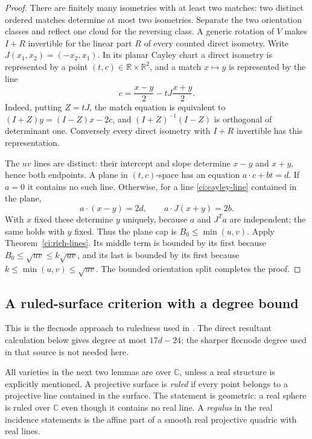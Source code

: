 \begin{proof}
There are finitely many isometries with at least two matches: two
distinct ordered matches determine at most two isometries.  Separate
the two orientation classes and reflect one cloud for the reversing
class.  A generic rotation of $V$ makes $I+R$ invertible for the
linear part $R$ of every counted direct isometry.  Write
$J(x_1,x_2)=(-x_2,x_1)$.  In its planar Cayley chart a direct
isometry is represented by a point $(t,c)\in\mathbb R\times\mathbb R^2$,
and a match $x\mapsto y$ is represented by the line
\begin{equation}\label{ci:cayley-line}
 c=\frac{x-y}{2}-tJ\frac{x+y}{2}.
\end{equation}
Indeed, putting $Z=tJ$, the match equation is equivalent to
$(I+Z)y=(I-Z)x-2c$, and $(I+Z)^{-1}(I-Z)$ is orthogonal of
determinant one.  Conversely every direct isometry with $I+R$
invertible has this representation.

The $uv$ lines are distinct: their intercept and slope determine
$x-y$ and $x+y$, hence both endpoints.  A plane in $(t,c)$-space
has an equation $a\cdot c+bt=d$.  If $a=0$ it contains no such
line.  Otherwise, for a line \eqref{ci:cayley-line} contained in
the plane,
\[
 a\cdot(x-y)=2d,\qquad a\cdot J(x+y)=2b.
\]
With $x$ fixed these determine $y$ uniquely, because $a$ and
$J^Ta$ are independent; the same holds with $y$ fixed.  Thus the
plane cap is $B_0\le\min(u,v)$.  Apply
Theorem~\ref{ci:rich-lines}.  Its middle term is bounded by its
first because $B_0\le\sqrt{uv}\le k\sqrt{uv}$, and its last is
bounded by its first because $k\le\min(u,v)\le\sqrt{uv}$.
The bounded orientation split completes the proof.
\end{proof}

\subsection{A ruled-surface criterion with a degree bound}

This is the flecnode approach to ruledness used in
\cite[Section~3, Proposition~3.2 and Corollary~3.3]{guthkatz2015}.
The direct resultant calculation below gives degree at most $17d-24$;
the sharper flecnode degree used in that source is not needed here.

All varieties in the next two lemmas are over $\mathbb C$, unless a
real structure is explicitly mentioned.  A projective surface is
\emph{ruled} if every point belongs to a projective line contained in
the surface.  The statement is geometric: a real sphere is ruled
over $\mathbb C$ even though it contains no real line.  A
\emph{regulus} in the real incidence statements is the affine part
of a smooth real projective quadric with real lines.

